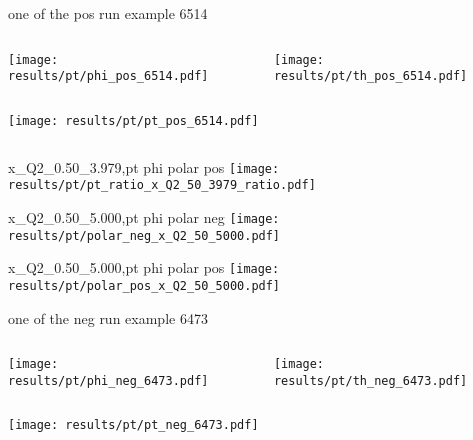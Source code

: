 \begin{frame}{one of the pos run example 6514}
\begin{columns}
\begin{column}[T]{0.5\textwidth}
\texttt{[image: results/pt/phi\_pos\_6514.pdf]}
\end{column}
\begin{column}[T]{0.5\textwidth}
\texttt{[image: results/pt/th\_pos\_6514.pdf]}
\end{column}
\end{columns}
\begin{columns}
\begin{column}[T]{0.5\textwidth}
\texttt{[image: results/pt/pt\_pos\_6514.pdf]}
\end{column}
\begin{column}[T]{0.5\textwidth}
\end{column}
\end{columns}
\end{frame}
\begin{frame}{x\_Q2\_0.50\_3.979,pt phi polar pos}
\texttt{[image: results/pt/pt\_ratio\_x\_Q2\_50\_3979\_ratio.pdf]}
\end{frame}
\begin{frame}{x\_Q2\_0.50\_5.000,pt phi polar neg}
\texttt{[image: results/pt/polar\_neg\_x\_Q2\_50\_5000.pdf]}
\end{frame}
\begin{frame}{x\_Q2\_0.50\_5.000,pt phi polar pos}
\texttt{[image: results/pt/polar\_pos\_x\_Q2\_50\_5000.pdf]}
\end{frame}
\begin{frame}{one of the neg run example 6473}
\begin{columns}
\begin{column}[T]{0.5\textwidth}
\texttt{[image: results/pt/phi\_neg\_6473.pdf]}
\end{column}
\begin{column}[T]{0.5\textwidth}
\texttt{[image: results/pt/th\_neg\_6473.pdf]}
\end{column}
\end{columns}
\texttt{[image: results/pt/pt\_neg\_6473.pdf]}
\end{frame}
